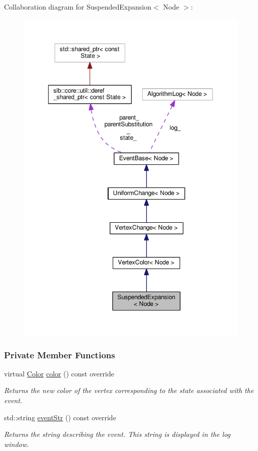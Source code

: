 Collaboration diagram for Suspended\+Expansion$<$ Node $>$\+:\nopagebreak
\begin{figure}[H]
\begin{center}
\leavevmode
\includegraphics[width=350pt]{structSuspendedExpansion__coll__graph}
\end{center}
\end{figure}
\subsubsection*{Private Member Functions}
\begin{DoxyCompactItemize}
\item 
virtual \hyperlink{colors_8h_ab87bacfdad76e61b9412d7124be44c1c}{Color} \hyperlink{structSuspendedExpansion_a16941d1b48ab9ce0a822c380b5e42b90}{color} () const override
\begin{DoxyCompactList}\small\item\em Returns the new color of the vertex corresponding to the state associated with the event. \end{DoxyCompactList}\item 
std\+::string \hyperlink{structSuspendedExpansion_ad479c0541d609b0584eb4d8edfc67c7c}{event\+Str} () const override
\begin{DoxyCompactList}\small\item\em Returns the string describing the event. This string is displayed in the log window. \end{DoxyCompactList}\end{DoxyCompactItemize}
